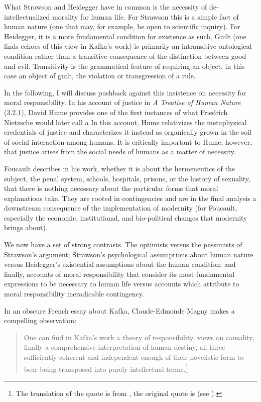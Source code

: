 \documentclass[11pt]{article}
\begin{document}
What Strawson and Heidegger have in common is the necessity of
de-intellec\-tualized morality for human life. For Strawson this is a
simple fact of human nature (one that may, for example, be open to
scientific inquiry). For Heidegger, it is a more fundamental condition
for existence as such. Guilt (one finds echoes of this view in Kafka's
work) is primarily an intransitive ontological condition rather than a
transitive consequence of the distinction between good and evil.
Transitivity is the grammatical feature of requiring an object, in
this case an object of guilt, the violation or transgression of a
rule.

In the following, I will discuss pushback against this insistence on
necessity for moral responsibility. In his account of justice in
\emph{A Treatise of Human Nature} (3.2.1), David Hume provides one of
the first instances of what Friedrich Nietzsche would later call a
 In this account, Hume relativizes the metaphysical
credentials of justice and characterizes it instead as organically
grown in the soil of social interaction among humans. It is critically
important to Hume, however, that justice arises from the social needs
of humans as a matter of necessity.

Foucault describes in his work, whether it is about the hermeneutics
of the subject, the penal system, schools, hospitals, prisons, or the
history of sexuality, that there is nothing necessary about the
particular forms that moral explanations take. They are rooted in
contingencies and are in the final analysis a downstream consequence
of the implementation of modernity (for Foucault, especially the
economic, institutional, and bio-political changes that modernity
brings about).

We now have a set of strong contrasts. The optimists versus the
pessimists of Strawson's argument; Strawson's psychological
assumptions about human nature versus Heidegger's existential
assumptions about the human condition; and finally, accounts of moral
responsibility that consider its most fundamental expressions to be
necessary to human life versus accounts which attribute to moral
responsibility ineradicable contingency.

In an obscure French essay about Kafka, Claude-Edmonde Magny makes a
compelling observation:

\begin{quote}
  One can find in Kafka's work a theory of responsibility, views
  on causality, finally a comprehensive interpretation of human
  destiny, all three sufficiently coherent and independent enough
  of their novelistic form to bear being transposed into purely
  intellectual terms.\footnote{The translation of the quote is
    from , the original quote is 
    (see ).}
\end{quote}
\end{document}
